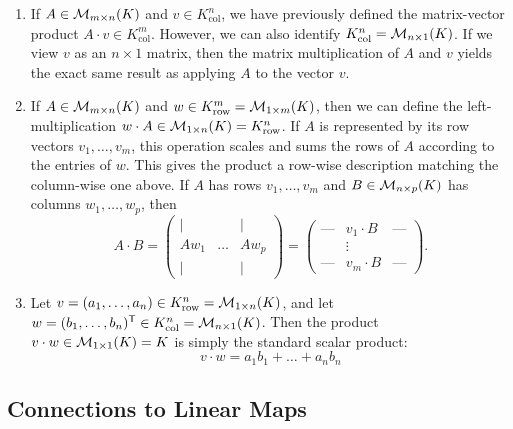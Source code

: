 \begin{enumerate}
    \item If $A \in \mathcal{M}_{m \times n}(K)$ and $v \in K_{\text{col}}^{n}$, we have previously defined the matrix-vector product $A \cdot v \in K_{\text{col}}^{m}$. However, we can also identify $K_{\text{col}}^{n} = \mathcal{M}_{n \times 1}(K)$. If we view $v$ as an $n \times 1$ matrix, then the matrix multiplication of $A$ and $v$ yields the exact same result as applying $A$ to the vector $v$.
    
    \item If $A \in \mathcal{M}_{m \times n}(K)$ and $w \in K_{\text{row}}^{m} = \mathcal{M}_{1 \times m}(K)$, then we can define the left-multiplication $w \cdot A \in \mathcal{M}_{1 \times n}(K) = K_{\text{row}}^{n}$. If $A$ is represented by its row vectors $v_1, \dots, v_m$, this operation scales and sums the rows of $A$ according to the entries of $w$.
    This gives the product a row-wise description matching the column-wise one above. If $A$ has rows $v_1, \dots, v_m$ and $B \in \mathcal{M}_{n \times p}(K)$ has columns $w_1, \dots, w_p$, then
    \begin{equation*}
        A \cdot B = \begin{pmatrix} | & & | \\ A w_1 & \dots & A w_p \\ | & & | \end{pmatrix} = \begin{pmatrix} \text{---} & v_1 \cdot B & \text{---} \\ & \vdots & \\ \text{---} & v_m \cdot B & \text{---} \end{pmatrix}.
    \end{equation*}
    
    \item Let $v = (a_1, \dots, a_n) \in K_{\text{row}}^{n} = \mathcal{M}_{1 \times n}(K)$, and let $w = (b_1, \dots, b_n)^{\mathsf{T}} \in K_{\text{col}}^{n} = \mathcal{M}_{n \times 1}(K)$. Then the product $v \cdot w \in \mathcal{M}_{1 \times 1}(K) = K$ is simply the standard scalar product:
    \begin{equation*}
        v \cdot w = a_1 b_1 + \dots + a_n b_n
    \end{equation*}
\end{enumerate}

\subsection{Connections to Linear Maps}

